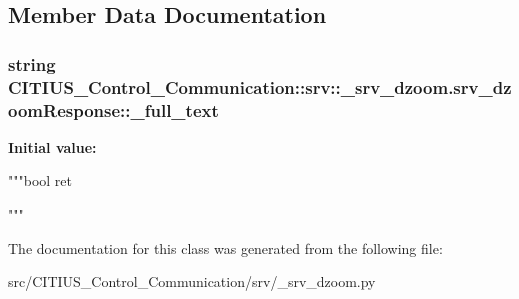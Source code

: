 \subsection{\-Member \-Data \-Documentation}
\hypertarget{class_c_i_t_i_u_s___control___communication_1_1srv_1_1__srv__dzoom_1_1srv__dzoom_response_a3a7a487ede7ed51f4a755dbb6c96c5f6}{
\subsubsection[{\-\_\-full\-\_\-text}]{\setlength{\rightskip}{0pt plus 5cm}string \-C\-I\-T\-I\-U\-S\-\_\-\-Control\-\_\-\-Communication\-::srv\-::\-\_\-srv\-\_\-dzoom.\-srv\-\_\-dzoom\-Response\-::\-\_\-full\-\_\-text}}\label{class_c_i_t_i_u_s___control___communication_1_1srv_1_1__srv__dzoom_1_1srv__dzoom_response_a3a7a487ede7ed51f4a755dbb6c96c5f6}
{\bfseries \-Initial value\-:}
\begin{DoxyCode}
"""bool ret


"""
\end{DoxyCode}


\-The documentation for this class was generated from the following file\-:\begin{DoxyCompactItemize}
\item 
src/\-C\-I\-T\-I\-U\-S\-\_\-\-Control\-\_\-\-Communication/srv/\-\_\-srv\-\_\-dzoom.\-py\end{DoxyCompactItemize}
